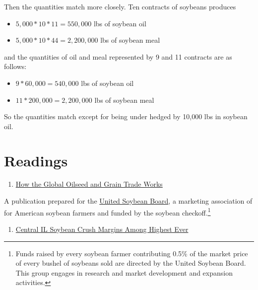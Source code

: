 \documentclass[
  letterpaper,
  DIV=11,
  numbers=noendperiod]{scrreprt}
\providecommand{\tightlist}{%
  \setlength{\itemsep}{0pt}\setlength{\parskip}{0pt}}\usepackage{longtable,booktabs,array}
\begin{document}
Then the quantities match more closely. Ten contracts of soybeans
produces

\begin{itemize}
\tightlist
\item
  \(5,000*10*11 = 550,000\) lbs of soybean oil
\item
  \(5,000*10*44 = 2,200,000\) lbs of soybean meal
\end{itemize}

and the quantities of oil and meal represented by 9 and 11 contracts are
as follows:

\begin{itemize}
\tightlist
\item
  \(9*60,000 = 540,000\) lbs of soybean oil
\item
  \(11*200,000 = 2,200,000\) lbs of soybean meal
\end{itemize}

So the quantities match except for being under hedged by 10,000 lbs in
soybean oil.

\section{Readings}\label{readings-4}

\begin{enumerate}
\def\labelenumi{\arabic{enumi}.}
\tightlist
\item
  \href{http://unitedsoybean.org/wp-content/uploads/2013/07/RevisedJan12_GlobalOilSeedGrainTrade_2011.pdf}{How
  the Global Oilseed and Grain Trade Works}
\end{enumerate}

A publication prepared for the \href{http://unitedsoybean.org/}{United
Soybean Board}, a marketing association of for American soybean farmers
and funded by the soybean checkoff.\footnote{Funds raised by every
  soybean farmer contributing 0.5\% of the market price of every bushel
  of soybeans sold are directed by the United Soybean Board. This group
  engages in research and market development and expansion activities.}

\begin{enumerate}
\def\labelenumi{\arabic{enumi}.}
\setcounter{enumi}{1}
\tightlist
\item
  \href{http://www.dtnprogressivefarmer.com/dtnag/common/link.do;jsessionid=CA98693F5E3C9EF37EC1F032464A6388.agfreejvm1?symbolicName=/ag/blogs/template1&blogHandle=agfundamental&blogEntryId=8a82c0bc372e8fba0137a8324dd704cf}{Central
  IL Soybean Crush Margins Among Highest Ever}
\end{enumerate}
\end{document}
